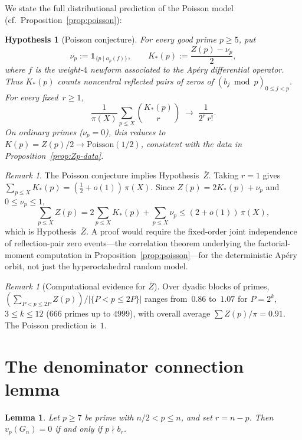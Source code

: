 \documentclass[11pt]{article}
\newtheorem{lemma}[theorem]{Lemma}
\newtheorem{hypothesis}[theorem]{Hypothesis}
\theoremstyle{definition}
\theoremstyle{remark}
\newtheorem{remark}[theorem]{Remark}
\begin{document}
We state the full distributional prediction
of the Poisson model
(cf.\ Proposition~\ref{prop:poisson}):

\begin{hypothesis}[Poisson conjecture]\label{hyp:poisson}
For every good prime $p \ge 5$, put
\[
\nu_p := \mathbf{1}_{\{p \mid a_p(f)\}},
\qquad
K_*(p) := \frac{Z(p) - \nu_p}{2},
\]
where $f$ is the weight-$4$ newform associated to
the Ap\'ery differential operator.
Thus $K_*(p)$ counts noncentral reflected pairs
of zeros of $(b_j \bmod p)_{0 \le j < p}$.
For every fixed~$r \ge 1$,
\[
\frac{1}{\pi(X)}
\sum_{p \le X}
\binom{K_*(p)}{r}
\;\longrightarrow\;
\frac{1}{2^r\, r!}.
\]
On ordinary primes ($\nu_p = 0$), this reduces to
$K(p) = Z(p)/2 \to \mathrm{Poisson}(1/2)$,
consistent with the data in
Proposition~\ref{prop:Zp-data}.
\end{hypothesis}

\begin{remark}\label{rem:poisson-implies}
The Poisson conjecture implies
Hypothesis~$\bar{Z}$.
Taking $r = 1$ gives
$\sum_{p \le X} K_*(p)
= (\tfrac{1}{2} + o(1))\,\pi(X)$.
Since $Z(p) = 2K_*(p) + \nu_p$ and
$0 \le \nu_p \le 1$,
\[
\sum_{p \le X} Z(p)
= 2\sum_{p \le X} K_*(p)
  + \sum_{p \le X} \nu_p
\le (2 + o(1))\,\pi(X),
\]
which is Hypothesis~$\bar{Z}$.
A proof would require
the fixed-order joint independence
of reflection-pair zero events---the
correlation theorem underlying the
factorial-moment computation in
Proposition~\ref{prop:poisson}---for the
deterministic Ap\'ery orbit, not just the
hyperoctahedral random model.
\end{remark}

\begin{remark}[Computational evidence for $\bar{Z}$]
\label{rem:Zbar-data}
Over dyadic blocks of primes,
$(\sum_{P < p \le 2P} Z(p))/|\{P < p \le 2P\}|$
ranges from~$0.86$ to~$1.07$ for $P = 2^k$,
$3 \le k \le 12$ ($666$ primes up to $4999$),
with overall average $\sum Z(p)/\pi = 0.91$.
The Poisson prediction is~$1$.
\end{remark}

\section{The denominator connection lemma}

\begin{lemma}\label{lem:denom}
Let $p \ge 7$ be prime with $n/2 < p \le n$, and set $r = n - p$.
Then $v_p(G_n) = 0$ if and only if $p \nmid b_r$.
\end{lemma}
\end{document}
